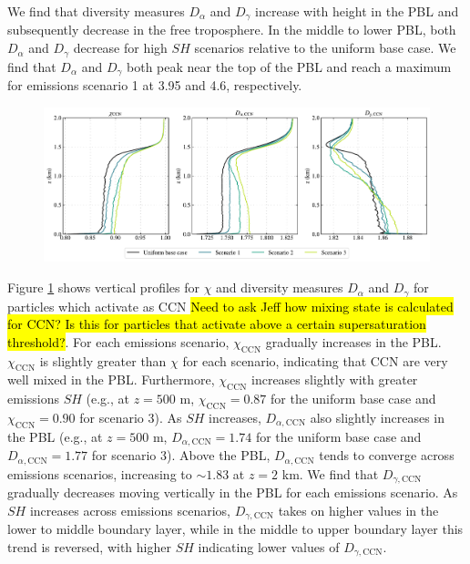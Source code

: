 We find that diversity measures $D_{\alpha}$ and $D_{\gamma}$ increase with height in the PBL and subsequently decrease in the free troposphere. In the middle to lower PBL, both $D_{\alpha}$ and $D_{\gamma}$ decrease for high $SH$ scenarios relative to the uniform base case. We find that $D_{\alpha}$ and $D_{\gamma}$ both peak near the top of the PBL and reach a maximum for emissions scenario 1 at 3.95 and 4.6, respectively. 

\begin{figure}[!t]
  \centering
    \includegraphics[width=\textwidth]{figures/chapter5/aerosol-ccn-mixingstate-vertical-profiles-time36.pdf}
    \caption{}
    \label{fig:ccn-mixing-state-vert-profiles}
\end{figure}

Figure \ref{fig:ccn-mixing-state-vert-profiles} shows vertical profiles for $\chi$ and diversity measures $D_{\alpha}$ and $D_{\gamma}$ for particles which activate as CCN \hl{Need to ask Jeff how mixing state is calculated for CCN? Is this for particles that activate above a certain supersaturation threshold?}. For each emissions scenario, $\chi_{\text{CCN}}$ gradually increases in the PBL. $\chi_{\text{CCN}}$ is slightly greater than $\chi$ for each scenario, indicating that CCN are very well mixed in the PBL. Furthermore, $\chi_{\text{CCN}}$ increases slightly with greater emissions $SH$ (e.g., at $z=500$ m, $\chi_{\text{CCN}} = 0.87$ for the uniform base case and $\chi_{\text{CCN}} = 0.90$ for scenario 3). As $SH$ increases, $D_{\alpha,\text{CCN}}$ also slightly increases in the PBL (e.g., at $z=500$ m, $D_{\alpha,\text{CCN}} = 1.74$ for the uniform base case and $D_{\alpha,\text{CCN}} = 1.77$ for scenario 3). Above the PBL, $D_{\alpha,\text{CCN}}$ tends to converge across emissions scenarios, increasing to $\sim1.83$ at $z=2$ km. We find that $D_{\gamma,\text{CCN}}$ gradually decreases moving vertically in the PBL for each emissions scenario. As $SH$ increases across emissions scenarios, $D_{\gamma,\text{CCN}}$ takes on higher values in the lower to middle boundary layer, while in the middle to upper boundary layer this trend is reversed, with higher $SH$ indicating lower values of $D_{\gamma,\text{CCN}}$. 

